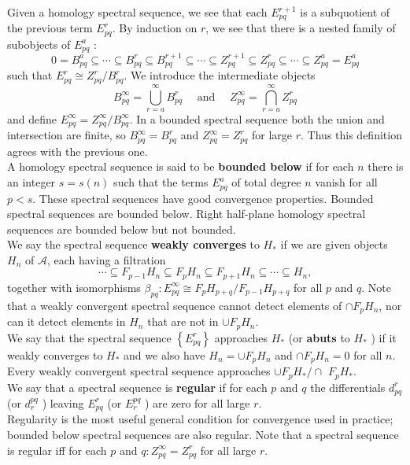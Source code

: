 Given a homology spectral sequence, we see that each $E_{p q}^{r+1}$ is a subquotient of the previous term $E_{p q}^r$. By induction on $r$, we see that there is a nested family of subobjects of $E_{p q}^a$ :
$$
0=B_{p q}^a \subseteq \cdots \subseteq B_{p q}^r \subseteq B_{p q}^{r+1} \subseteq \cdots \subseteq Z_{p q}^{r+1} \subseteq Z_{p q}^r \subseteq \cdots \subseteq Z_{p q}^a=E_{p q}^a
$$
such that $E_{p q}^r \cong Z_{p q}^r / B_{p q}^r$. We introduce the intermediate objects
$$
B_{p q}^{\infty}=\bigcup_{r=a}^{\infty} B_{p q}^r \quad \text { and } \quad Z_{p q}^{\infty}=\bigcap_{r=a}^{\infty} Z_{p q}^r
$$
and define $E_{p q}^{\infty}=Z_{p q}^{\infty} / B_{p q}^{\infty}$. In a bounded spectral sequence both the union and intersection are finite, so $B_{p q}^{\infty}=B_{p q}^r$ and $Z_{p q}^{\infty}=Z_{p q}^r$ for large $r$. Thus this definition agrees with the previous one.\\
A homology spectral sequence is said to be \textbf{bounded below }if for each $n$ there is an integer $s=s(n)$ such that the terms $E_{p q}^a$ of total degree $n$ vanish for all $p<s$. These spectral sequences have good convergence properties. Bounded spectral sequences are bounded below. Right half-plane homology spectral sequences are bounded below but not bounded.\\

We say the spectral sequence \textbf{weakly converges} to $H_*$ if we are given objects $H_n$ of $\mathcal{A}$, each having a filtration
$$
\cdots \subseteq F_{p-1} H_n \subseteq F_p H_n \subseteq F_{p+1} H_n \subseteq \cdots \subseteq H_n,
$$
together with isomorphisms $\beta_{p q}: E_{p q}^{\infty} \cong F_p H_{p+q} / F_{p-1} H_{p+q}$ for all $p$ and $q$. Note that a weakly convergent spectral sequence cannot detect elements of $\cap F_p H_n$, nor can it detect elements in $H_n$ that are not in $\cup F_p H_n$.\\
We say that the spectral sequence $\left\{E_{p q}^r\right\}$ approaches $H_*$ (or \textbf{abuts} to $H_*$ ) if it weakly converges to $H_*$ and we also have $H_n=\cup F_p H_n$ and $\cap F_p H_n=0$ for all $n$. Every weakly convergent spectral sequence approaches $\cup F_p H_* / \cap$ $F_p H_*$.\\

We say that a spectral sequence is \textbf{regular} if for each $p$ and $q$ the differentials $d_{p q}^r$ (or $d_r^{p q}$ ) leaving $E_{p q}^r$ (or $E_r^{p q}$ ) are zero for all large $r$. \\
Regularity is the most useful general condition for convergence used in practice; bounded below spectral sequences are also regular. Note that a spectral sequence is regular iff for each $p$ and $q: Z_{p q}^{\infty}=Z_{p q}^r$ for all large $r$.\\

